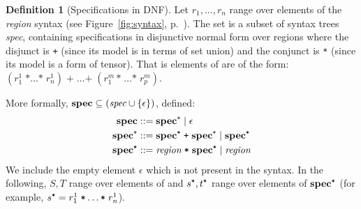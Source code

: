 \documentclass[9pt]{sigplanconf}
\newcounter{block}
\theoremstyle{definition}
\newtheorem{definition}[block]{Definition}
\newcommand{\term}[1]{\texttt{#1}}
\begin{document}
\begin{definition}[Specifications in DNF]
Let $r_1, ..., r_n$ range over elements of the \textit{region}
syntax (see Figure~\ref{fig:syntax}, p.~\pageref{fig:syntax}).
The set \specDNF{} is a subset of syntax trees \textit{spec},
containing specifications in disjunctive normal form over regions 
where the disjunct is \term{+} (since its model is in terms of set
union) and the conjunct is \term{*} (since its model is a form of tensor).
That is elements of \specDNF{} are of the form:
$
(r^1_{1} \; \term{*} \ldots \term{*} \; r^1_n)\; \term{+} \; \ldots 
\term{+} \; (r^m_1 \, \term{*} \; \ldots \term{*} \; r^m_p)
$. 

More formally, $\textbf{spec} \subseteq (\textit{spec} \cup \{\epsilon\})$, defined:
\begin{align*}
\specDNF{} & ::= \tySum{\specDNF} \mid \epsilon \\
\tySum{\specDNF} & ::= \tyProd{\specDNF} \; \term{+} \; \tySum{\specDNF} \mid
  \tyProd{\specDNF} \\
\tyProd{\specDNF} & ::= \textit{region} \; \term{*} \; \tyProd{\specDNF} \mid
   \textit{region}
\end{align*}
We include the empty element $\epsilon$ which is not present in the
syntax. 
In the following, $S, T$ range over elements of
\specDNF{} and $\tyProd{s}, \tyProd{t}$ range over elements
of $\tyProd{\specDNF}$ (for example, $\tyProd{s} = r^1_{1} \; \term{*}
\ldots \term{*} \; r^1_n$).
\end{definition}

\newcommand{\exactR}{\mathsf{exact}\;}
\newcommand{\exact}[1]{\exactR(#1)}
\newcommand{\upperB}[1]{\mathsf{upper}\;(#1)}
\end{document}
